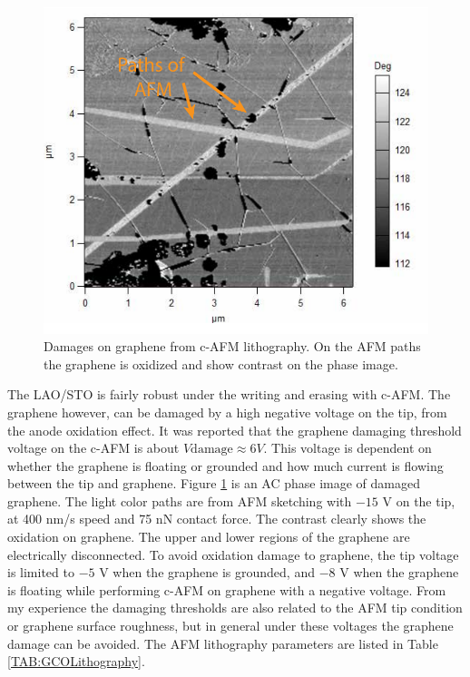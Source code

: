 \documentclass[pdflatex, sectionletters, 12pt]{pittetd}    %
\begin{document}
\begin{figure}[h!]
	\centering
	\includegraphics[width=.7\textwidth]{Drawing/GrapheneDamages.pdf}
	\caption{Damages on graphene from c-AFM lithography. On the AFM paths the graphene is oxidized and show contrast on the phase image.}
	\label{FIG:GrapheneDamages}
\end{figure}

The LAO/STO is fairly robust under the writing and erasing with c-AFM. The graphene however, can be damaged by a high negative voltage on the tip, from the anode oxidation effect\cite{}. It was reported\cite{} that the graphene damaging threshold voltage on the c-AFM is about $V{\mathrm{damage}} \approx 6 V$. This voltage is dependent on whether the graphene is floating or grounded and how much current is flowing between the tip and graphene. Figure \ref{FIG:GrapheneDamages} is an AC phase image of damaged graphene. The light color paths are from AFM sketching with $-15$ V on the tip, at 400 nm/s speed and 75 nN contact force. The contrast clearly shows the oxidation on graphene. The upper and lower regions of the graphene are electrically disconnected. To avoid oxidation damage to graphene, the tip voltage is limited to $-5$ V when the graphene is grounded, and $-8$ V when the graphene is floating while performing c-AFM on graphene with a negative voltage. From my experience the damaging thresholds are also related to the AFM tip condition or graphene surface roughness, but in general under these voltages the graphene damage can be avoided. The AFM lithography parameters are listed in Table \ref{TAB:GCOLithography}.
\end{document}
